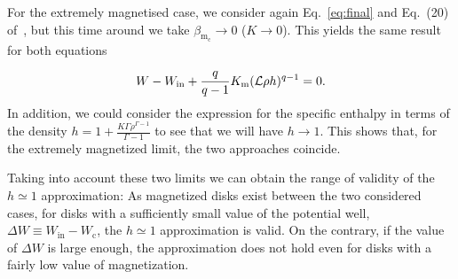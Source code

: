 \documentclass[twocolumn,aps,showpacs,showkeys,prd,superscriptaddress,byrevtex, amsmath]{revtex4-1}
\begin{document}

For the extremely magnetised case, we consider again Eq.~\eqref{eq:final} and Eq.~(20) of~\cite{Gimeno-Soler:2017}, but this time around we take $\beta_{\mathrm{m_c}} \rightarrow 0$ ($K \rightarrow 0$). This yields the same result for both equations

\begin{equation}
W - W_{\mathrm{in}} + \frac{q}{q-1}K_{\rm m}(\mathcal{L}\rho h)^{q-1}=0.
\end{equation}
In addition, we could consider the expression for the specific enthalpy in terms of the density $h = 1 + \frac{K\Gamma\rho^{\Gamma-1}}{\Gamma - 1}$ to 
see that we will have $h \rightarrow 1$. This shows that, for the extremely magnetized limit, the two approaches coincide.

Taking into account these two limits we can obtain the range of validity of the $h \simeq 1$ approximation: As magnetized disks exist between the two considered cases, for disks with a sufficiently small value of the potential well, $\Delta W \equiv W_{\mathrm{in}} - W_{\mathrm{c}}$, the $h \simeq 1$ approximation is valid. On the contrary, if the value of $\Delta W$ is large enough, the approximation does not hold even for disks with a fairly low value of magnetization.
\end{document}
